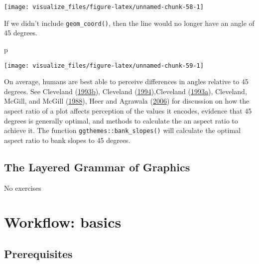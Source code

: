 \documentclass[]{book}
\newenvironment{Shaded}{\begin{snugshade}}{\end{snugshade}}
\newcommand{\NormalTok}[1]{#1}
\theoremstyle{plain}
\theoremstyle{remark}
\theoremstyle{definition}
\theoremstyle{definition}
\theoremstyle{definition}
\theoremstyle{remark}
\begin{document}
\begin{center}\texttt{[image: visualize\_files/figure-latex/unnamed-chunk-58-1]} \end{center}

If we didn't include \texttt{geom\_coord()}, then the line would no
longer have an angle of 45 degrees.

\begin{Shaded}
\begin{Highlighting}[]
\NormalTok{p}
\end{Highlighting}
\end{Shaded}

\begin{center}\texttt{[image: visualize\_files/figure-latex/unnamed-chunk-59-1]} \end{center}

On average, humans are best able to perceive differences in angles
relative to 45 degrees. See Cleveland
(\protect\hyperlink{ref-Cleveland1993}{1993}\protect\hyperlink{ref-Cleveland1993}{b}),
Cleveland (\protect\hyperlink{ref-Cleveland1994}{1994}),Cleveland
(\protect\hyperlink{ref-Cleveland1993a}{1993}\protect\hyperlink{ref-Cleveland1993a}{a}),
Cleveland, McGill, and McGill
(\protect\hyperlink{ref-ClevelandMcGillMcGill1988}{1988}), Heer and
Agrawala (\protect\hyperlink{ref-HeerAgrawala2006}{2006}) for discussion
on how the aspect ratio of a plot affects perception of the values it
encodes, evidence that 45 degrees is generally optimal, and methods to
calculate the an aspect ratio to achieve it. The function
\texttt{ggthemes::bank\_slopes()} will calculate the optimal aspect
ratio to bank slopes to 45 degrees.

\hypertarget{the-layered-grammar-of-graphics}{%
\section{The Layered Grammar of
Graphics}\label{the-layered-grammar-of-graphics}}

No exercises

\hypertarget{workflow-basics}{%
\chapter{Workflow: basics}\label{workflow-basics}}

\hypertarget{prerequisites}{%
\section*{Prerequisites}\label{prerequisites}}
\end{document}
